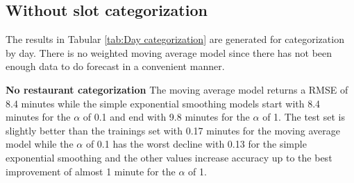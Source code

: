 \subsection{Without slot categorization}
The results in Tabular \ref{tab:Day categorization} are generated for categorization by day. There is no weighted moving average model since there has not been enough data to do forecast in a convenient manner.
\begin{table}[h]
\centering
\caption{Day categorization without slot}
\label{tab:Day categorization}
\end{table}
\newline\newline\textbf{No restaurant categorization}\newline
The moving average model returns a RMSE of 8.4 minutes while the simple exponential smoothing models start with 8.4 minutes for the $\alpha$ of 0.1 and end with 9.8 minutes for the $\alpha$ of 1. The test set is slightly better than the trainings set with 0.17 minutes for the moving average model while the $\alpha$ of 0.1 has the worst decline with 0.13 for the simple exponential smoothing and the other values increase accuracy up to the best improvement of almost 1 minute for the $\alpha$ of 1.\newline
